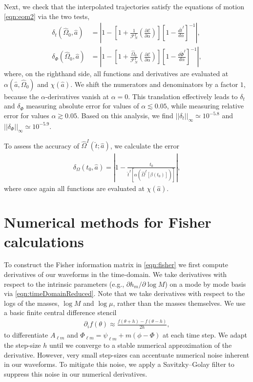 \documentclass[%
 reprint,
 nofootinbib,
 amsmath,amssymb,
 aps,
 prd,
]{revtex4-2}
\begin{document}
Next, we check that the interpolated trajectories satisfy the equations of motion \eqref{eqn:eom2} via the two tests,
\begin{align}
    \delta_{t}(\hat{\Omega}_0, \hat{a}) &= \left| 1 - \left[1 + \frac{1}{\mathcal{F}^I_N}\left(\frac{\partial\mathcal{E}}{\partial\alpha} \right)\right]\left[1 - \frac{d\check{t}^I}{d\alpha}\right]^{-1}\right|,
    \\
    \delta_{\Phi}(\hat{\Omega}_0, \hat{a}) &= \left| 1 -  \left[1 + \frac{\hat{\Omega}_0}{\mathcal{F}^I_N}\left(\frac{\partial\mathcal{E}}{\partial\alpha} \right)\right]\left[1 -\frac{d\check{\Phi}^I}{d{\alpha}} \right]^{-1}\right|,
\end{align}
where, on the righthand side, all functions and derivatives are evaluated at $\alpha(\hat{a},\hat{\Omega}_0)$ and $\chi(\hat{a})$. We shift the numerators and denominators by a factor $1$, because the $\alpha$-derivatives vanish at $\alpha = 0$. This translation effectively leads to $\delta_t$ and $\delta_\Phi$ measuring absolute error for values of $\alpha \lesssim 0.05$, while measuring relative error for values $\alpha \gtrsim 0.05$. Based on this analysis, we find $||\delta_t||_\infty \simeq 10^{-5.8}$ and $||\delta_\Phi||_\infty \simeq 10^{-5.9}$.

To assess the accuracy of $\hat{\Omega}^I(\check{t};\hat{a})$, we calculate the error
\begin{align}
    \delta_{\Omega}(t_0, \hat{a}) = \left| 1- \frac{t_0}{\check{t}^I[\alpha(\hat{\Omega}^I[\beta(t_0)])]} \right|,
\end{align}
where once again all functions are evaluated at $\chi(\hat{a})$.

\section{Numerical methods for Fisher calculations}
\label{app:fisher}

To construct the Fisher information matrix in \eqref{eqn:fisher} we first compute derivatives of our waveforms in the time-domain. We take derivatives with respect to the intrinsic parameters (e.g., $\partial h_m /\partial\log M$) on a mode by mode basis via \eqref{eqn:timeDomainReduced}. Note that we take derivatives with respect to the logs of the masses, $\log M$ and $\log \mu$, rather than the masses themselves. We use a basic finite central difference stencil
\begin{align}
    \partial_i f(\theta) \approx \frac{f(\theta + h) - f(\theta - h)}{2h},
\end{align}
to differentiate $A_{\ell m}$ and $\Phi_{\ell m} = \psi_{\ell m} + m(\phi - \Phi)$ at each time step. We adapt the step-size $h$ until we converge to a stable numerical approximation of the derivative. However, very small step-sizes can accentuate numerical noise inherent in our waveforms. To mitigate this noise, we apply a Savitzky–Golay filter to suppress this noise in our numerical derivatives.
\end{document}
